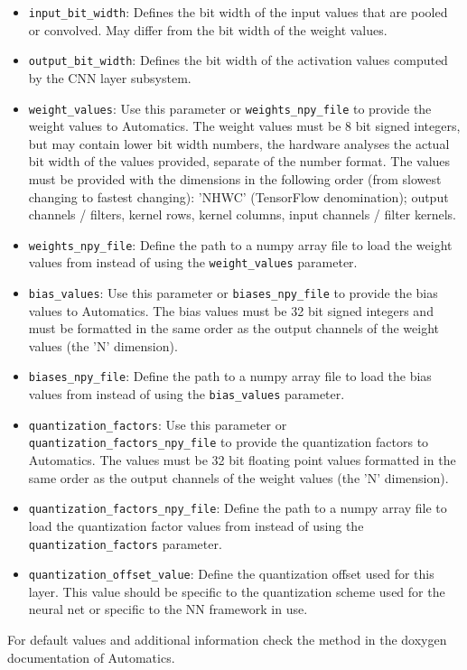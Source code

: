 \begin{itemize}
\item \texttt{input\_bit\_width}: Defines the bit width of the input values that are pooled or convolved. May differ from the bit width of the weight values.
\item \texttt{output\_bit\_width}: Defines the bit width of the activation values computed by the CNN layer subsystem.
\item \texttt{weight\_values}: Use this parameter or \texttt{weights\_npy\_file} to provide the weight values to Automatics. The weight values must be 8 bit signed integers, but may contain lower bit width numbers, the hardware analyses the actual bit width of the values provided, separate of the number format. The values must be provided with the dimensions in the following order (from slowest changing to fastest changing): 'NHWC' (TensorFlow denomination); output channels / filters, kernel rows, kernel columns, input channels / filter kernels.
\item \texttt{weights\_npy\_file}: Define the path to a numpy array file to load the weight values from instead of using the \texttt{weight\_values} parameter.
\item \texttt{bias\_values}: Use this parameter or \texttt{biases\_npy\_file} to provide the bias values to Automatics. The bias values must be 32 bit signed integers and must be formatted in the same order as the output channels of the weight values (the 'N' dimension).
\item \texttt{biases\_npy\_file}: Define the path to a numpy array file to load the bias values from instead of using the \texttt{bias\_values} parameter.
\item \texttt{quantization\_factors}: Use this parameter or \texttt{quantization\_factors\_npy\_file} to provide the quantization factors to Automatics. The values must be 32 bit floating point values formatted in the same order as the output channels of the weight values (the 'N' dimension).
\item \texttt{quantization\_factors\_npy\_file}: Define the path to a numpy array file to load the quantization factor values from instead of using the \texttt{quantization\_factors} parameter.
\item \texttt{quantization\_offset\_value}: Define the quantization offset used for this layer. This value should be specific to the quantization scheme used for the neural net or specific to the NN framework in use.
\end{itemize}

For default values and additional information check the  method in the doxygen documentation of Automatics.


